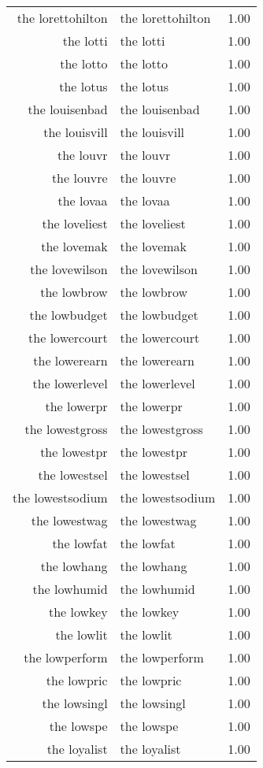 \begin{table}[ht]
\begin{tabular}{rlr}
  the lorettohilton & the lorettohilton & 1.00 \\ 
  the lotti & the lotti & 1.00 \\ 
  the lotto & the lotto & 1.00 \\ 
  the lotus & the lotus & 1.00 \\ 
  the louisenbad & the louisenbad & 1.00 \\ 
  the louisvill & the louisvill & 1.00 \\ 
  the louvr & the louvr & 1.00 \\ 
  the louvre & the louvre & 1.00 \\ 
  the lovaa & the lovaa & 1.00 \\ 
  the loveliest & the loveliest & 1.00 \\ 
  the lovemak & the lovemak & 1.00 \\ 
  the lovewilson & the lovewilson & 1.00 \\ 
  the lowbrow & the lowbrow & 1.00 \\ 
  the lowbudget & the lowbudget & 1.00 \\ 
  the lowercourt & the lowercourt & 1.00 \\ 
  the lowerearn & the lowerearn & 1.00 \\ 
  the lowerlevel & the lowerlevel & 1.00 \\ 
  the lowerpr & the lowerpr & 1.00 \\ 
  the lowestgross & the lowestgross & 1.00 \\ 
  the lowestpr & the lowestpr & 1.00 \\ 
  the lowestsel & the lowestsel & 1.00 \\ 
  the lowestsodium & the lowestsodium & 1.00 \\ 
  the lowestwag & the lowestwag & 1.00 \\ 
  the lowfat & the lowfat & 1.00 \\ 
  the lowhang & the lowhang & 1.00 \\ 
  the lowhumid & the lowhumid & 1.00 \\ 
  the lowkey & the lowkey & 1.00 \\ 
  the lowlit & the lowlit & 1.00 \\ 
  the lowperform & the lowperform & 1.00 \\ 
  the lowpric & the lowpric & 1.00 \\ 
  the lowsingl & the lowsingl & 1.00 \\ 
  the lowspe & the lowspe & 1.00 \\ 
  the loyalist & the loyalist & 1.00 \\ 

\end{tabular}
\end{table}
